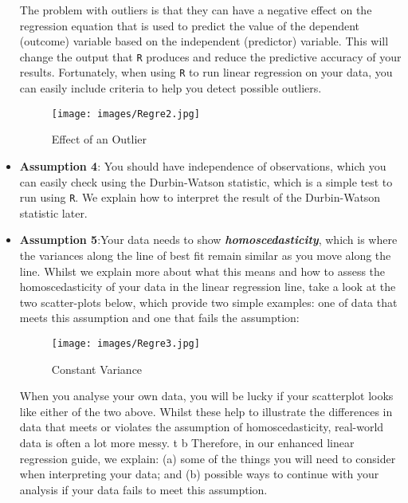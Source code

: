 \documentclass[]{report}
\begin{document}
\begin{itemize}
	The problem with outliers is that they can have a negative effect on the regression equation that is used to predict the value of the dependent (outcome) variable based on the independent (predictor) variable. This will change the output that \texttt{R} produces and reduce the predictive accuracy of your results. Fortunately, when using \texttt{R} to run linear regression on your data, you can easily include criteria to help you detect possible outliers.
	\begin{figure}[h!]
		\begin{centering}
			\texttt{[image: images/Regre2.jpg]}\\
			\caption{Effect of an Outlier}
		\end{centering}
	\end{figure}
	
	\item \textbf{Assumption 4}: You should have independence of observations, which you can easily check using the Durbin-Watson statistic, which is a simple test to run using \texttt{R}. We explain how to interpret the result of the Durbin-Watson statistic later.
	
	\item \textbf{Assumption 5}:Your data needs to show \textbf{\textit{homoscedasticity}}, which is where the variances along the line of best fit remain similar as you move along the line. Whilst we explain more about what this means and how to assess the homoscedasticity of your data in the linear regression line, take a look at the two scatter-plots below, which provide two simple examples: one of data that meets this assumption and one that fails the assumption:
	
	\begin{figure}[h!]
		\begin{centering}
			\texttt{[image: images/Regre3.jpg]}\\
			\caption{Constant Variance}
		\end{centering}
	\end{figure}
	
	
	
	When you analyse your own data, you will be lucky if your scatterplot looks like either of the two above. Whilst these help to illustrate the differences in data that meets or violates the assumption of homoscedasticity, real-world data is often a lot more messy. 
	t b
	Therefore, in our enhanced linear regression guide, we explain: (a) some of the things you will need to consider when interpreting your data; and (b) possible ways to continue with your analysis if your data fails to meet this assumption.
	

\end{itemize}
\end{document}
